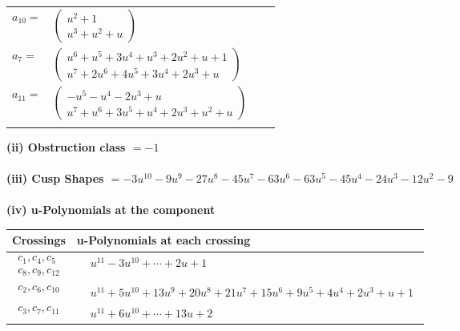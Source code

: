 \documentclass[1p]{elsarticle_modified}
\theoremstyle{definition}
\begin{document}
\begin{tabular}{m{7pt} m{180pt} m{7pt} m{180pt} }
\flushright $a_{10}=$&$\begin{pmatrix}u^2+1\\u^3+u^2+u\end{pmatrix}$ \\
\flushright $a_{7}=$&$\begin{pmatrix}u^6+u^5+3 u^4+u^3+2 u^2+u+1\\u^7+2 u^6+4 u^5+3 u^4+2 u^3+u\end{pmatrix}$ \\
\flushright $a_{11}=$&$\begin{pmatrix}- u^5- u^4-2 u^3+u\\u^7+u^6+3 u^5+u^4+2 u^3+u^2+u\end{pmatrix}$\\&\end{tabular}
\flushleft \textbf{(ii) Obstruction class $= -1$}\\~\\
\flushleft \textbf{(iii) Cusp Shapes $= -3 u^{10}-9 u^9-27 u^8-45 u^7-63 u^6-63 u^5-45 u^4-24 u^3-12 u^2-9$}\\~\\
\newpage\renewcommand{\arraystretch}{1}
\flushleft \textbf{(iv) u-Polynomials at the component}\newline \\
\begin{tabular}{m{50pt}|m{274pt}}
Crossings & \hspace{64pt}u-Polynomials at each crossing \\
\hline $$\begin{aligned}c_{1},c_{4},c_{5}\\c_{8},c_{9},c_{12}\end{aligned}$$&$\begin{aligned}
&u^{11}-3 u^{10}+\cdots+2 u+1
\end{aligned}$\\
\hline $$\begin{aligned}c_{2},c_{6},c_{10}\end{aligned}$$&$\begin{aligned}
&u^{11}+5 u^{10}+13 u^9+20 u^8+21 u^7+15 u^6+9 u^5+4 u^4+2 u^3+u+1
\end{aligned}$\\
\hline $$\begin{aligned}c_{3},c_{7},c_{11}\end{aligned}$$&$\begin{aligned}
&u^{11}+6 u^{10}+\cdots+13 u+2
\end{aligned}$\\
\hline
\end{tabular}\\~\\
\end{document}

